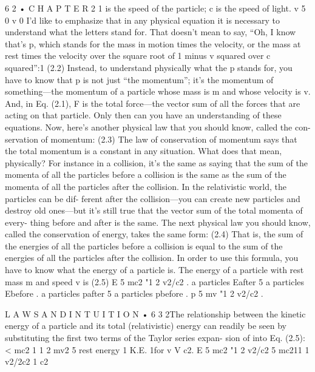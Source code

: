 \documentclass[10pt,oneside]{article}
\begin{document}
6 2 • C H A P T E R  2 1 is the speed of the particle; c is the speed of light. v 5 0 v 0 I’d like to emphasize that in any physical equation it is necessary to understand what the letters stand for. That doesn’t mean to say, “Oh, I know that’s p, which stands for the mass in motion times the velocity, or the mass at rest times the velocity over the square root of 1 minus v squared over c squared”:1 (2.2) Instead, to understand physically what the p stands for, you have to know that p is not just “the momentum”; it’s the momentum of something---the momentum of a particle whose mass is m and whose velocity is v. And, in Eq. (2.1), F is the total force---the vector sum of all the forces that are acting on that particle. Only then can you have an understanding of these equations. Now, here’s another physical law that you should know, called the con- servation of momentum: (2.3) The law of conservation of momentum says that the total momentum is a constant in any situation. What does that mean, physically? For instance in a collision, it’s the same as saying that the sum of the momenta of all the particles before a collision is the same as the sum of the momenta of all the particles after the collision. In the relativistic world, the particles can be dif- ferent after the collision---you can create new particles and destroy old ones---but it’s still true that the vector sum of the total momenta of every- thing before and after is the same. The next physical law you should know, called the conservation of energy, takes the same form: (2.4) That is, the sum of the energies of all the particles before a collision is equal to the sum of the energies of all the particles after the collision. In order to use this formula, you have to know what the energy of a particle is. The energy of a particle with rest mass m and speed v is (2.5) E 5 mc2 "1 2 v2/c2 . a particles Eafter 5 a particles Ebefore . a particles pafter 5 a particles pbefore . p 5 mv "1 2 v2/c2 .\par

L A W S  A N D  I N T U I T I O N • 6 3 2The relationship between the kinetic energy of a particle and its total (relativistic) energy can readily be seen by substituting the first two terms of the Taylor series expan- sion of into Eq. (2.5): < mc2 1 1 2 mv2 5 rest energy 1 K.E. 1for v V c2. E 5 mc2 "1 2 v2/c2 5 mc211 1 v2/2c2 1 c2\par
\end{document}
